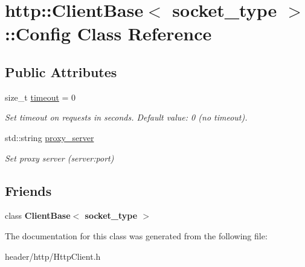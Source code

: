 \hypertarget{classhttp_1_1_client_base_1_1_config}{}\section{http\+:\+:Client\+Base$<$ socket\+\_\+type $>$\+:\+:Config Class Reference}
\label{classhttp_1_1_client_base_1_1_config}
\subsection*{Public Attributes}
\begin{DoxyCompactItemize}
\item 
\mbox{\label{classhttp_1_1_client_base_1_1_config_a29fca5b3083e075149d7cc8476d2092b}} 
size\+\_\+t \hyperlink{classhttp_1_1_client_base_1_1_config_a29fca5b3083e075149d7cc8476d2092b}{timeout} = 0
\begin{DoxyCompactList}\small\item\em Set timeout on requests in seconds. Default value\+: 0 (no timeout). \end{DoxyCompactList}\item 
\mbox{\label{classhttp_1_1_client_base_1_1_config_a607d1a8028e0c5faba269e3a342e830f}} 
std\+::string \hyperlink{classhttp_1_1_client_base_1_1_config_a607d1a8028e0c5faba269e3a342e830f}{proxy\+\_\+server}
\begin{DoxyCompactList}\small\item\em Set proxy server (server\+:port) \end{DoxyCompactList}\end{DoxyCompactItemize}
\subsection*{Friends}
\begin{DoxyCompactItemize}
\item 
\mbox{\label{classhttp_1_1_client_base_1_1_config_aee5298660229dd276c7169cf7ef3d387}} 
class {\bfseries Client\+Base$<$ socket\+\_\+type $>$}
\end{DoxyCompactItemize}


The documentation for this class was generated from the following file\+:\begin{DoxyCompactItemize}
\item 
header/http/Http\+Client.\+h\end{DoxyCompactItemize}
